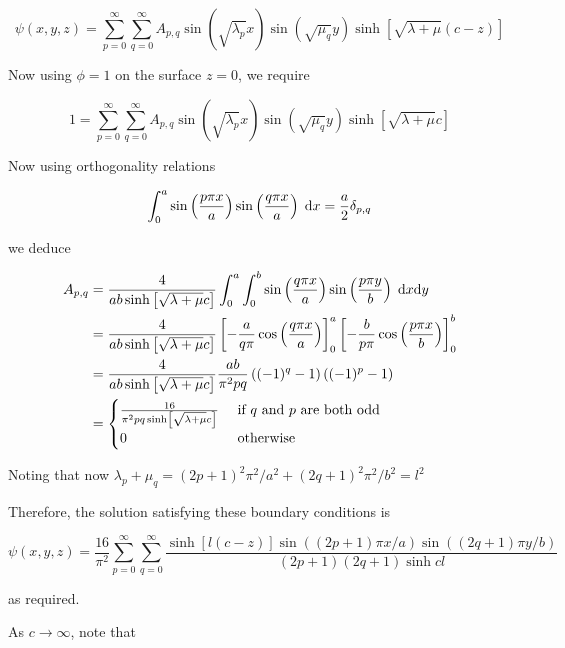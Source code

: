 \documentclass[a4paper]{article}
\begin{document}
\[ \psi(x,y,z) 
=  \sum_{p = 0}^{\infty} \sum_{q = 0}^{\infty}  A_{p,q} \sin \left(  \sqrt{\lambda_{p}} x \right) \sin \left(  \sqrt{\mu_{q}} y \right)  \sinh \left[  \sqrt{\lambda + \mu}(c - z)    \right]    \]

Now using $ \phi = 1 $ on the surface $ z = 0 $, we require

\[ 1 
=  \sum_{p = 0}^{\infty} \sum_{q = 0}^{\infty} A_{p,q} \sin \left(  \sqrt{\lambda_{p}} x \right) \sin \left(  \sqrt{\mu_{q}} y \right)  \sinh \left[  \sqrt{\lambda + \mu} c    \right] \]

Now using orthogonality relations

\[ \int_{0}^{a} \sin\left( \frac{p \pi x}{a} \right)\sin\left( \frac{q \pi x}{a} \right) \; \mathrm{d} x = \frac{a}{2} \delta_{p,q}  \]

we deduce

\begin{align*}
A_{p,q} & = \frac{4}{ab \sinh \left[  \sqrt{\lambda + \mu}c    \right]} \int_{0}^{a} \int_{0}^{b} \sin\left( \frac{q \pi x}{a} \right)\sin\left( \frac{p \pi y}{b} \right) \; \mathrm{d} x \mathrm{d} y \\
& = \frac{4}{ab \sinh \left[ \sqrt{\lambda + \mu}c    \right]} \left[   - \frac{a}{q \pi}  \cos \left(  \frac{q \pi x}{a} \right)  \right]_{0}^{a} \left[   - \frac{b}{p \pi}  \cos \left(  \frac{p \pi x}{b} \right)  \right]_{0}^{b} \\
&  =  \frac{4}{ab \sinh \left[  \sqrt{\lambda + \mu}c   \right]} \frac{ab}{\pi^{2} pq}\left(  (-1)^{q} - 1 \right)\left(  (-1)^{p} - 1 \right) \\
& = \begin{cases} \frac{16}{\pi^{2}pq \sinh \left[  \sqrt{\lambda + \mu}c    \right]}  & \text{ if } q \text{ and } p \text{ are both odd} \\ 0 & \text{ otherwise } \end{cases}
\end{align*}


Noting that now $ \lambda_{p} + \mu_{q} = (2p + 1)^{2} \pi^{2} / a^{2}  + (2q + 1)^{2} \pi^{2} / b^{2}= l^{2} $

Therefore, the solution satisfying these boundary conditions is

\[ \psi(x,y,z) 
=  \frac{16}{\pi^{2}} \sum_{p = 0}^{\infty} \sum_{q = 0}^{\infty} \frac{\sinh \left[  l(c - z)\right] \sin \left( (2p + 1)\pi x / a \right) \sin \left( (2q + 1)\pi y / b \right)   }{ (2p+1)(2q+1)\sinh cl   }   \]

as required.

As $ c  \to \infty $, note that 
\end{document}
